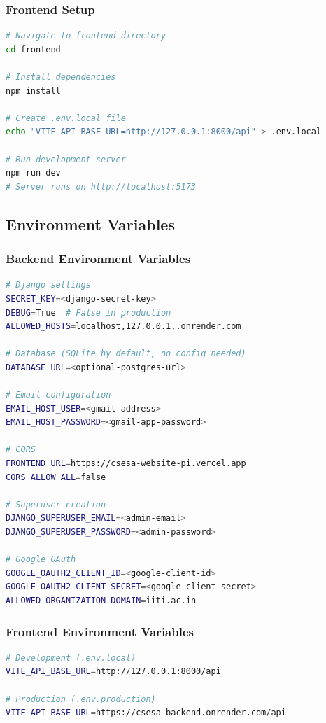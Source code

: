\documentclass[11pt,a4paper]{article}
\begin{document}
\subsubsection{Frontend Setup}
\begin{lstlisting}[language=bash]
# Navigate to frontend directory
cd frontend

# Install dependencies
npm install

# Create .env.local file
echo "VITE_API_BASE_URL=http://127.0.0.1:8000/api" > .env.local

# Run development server
npm run dev
# Server runs on http://localhost:5173
\end{lstlisting}

\subsection{Environment Variables}

\subsubsection{Backend Environment Variables}
\begin{lstlisting}[language=bash]
# Django settings
SECRET_KEY=<django-secret-key>
DEBUG=True  # False in production
ALLOWED_HOSTS=localhost,127.0.0.1,.onrender.com

# Database (SQLite by default, no config needed)
DATABASE_URL=<optional-postgres-url>

# Email configuration
EMAIL_HOST_USER=<gmail-address>
EMAIL_HOST_PASSWORD=<gmail-app-password>

# CORS
FRONTEND_URL=https://csesa-website-pi.vercel.app
CORS_ALLOW_ALL=false

# Superuser creation
DJANGO_SUPERUSER_EMAIL=<admin-email>
DJANGO_SUPERUSER_PASSWORD=<admin-password>

# Google OAuth
GOOGLE_OAUTH2_CLIENT_ID=<google-client-id>
GOOGLE_OAUTH2_CLIENT_SECRET=<google-client-secret>
ALLOWED_ORGANIZATION_DOMAIN=iiti.ac.in
\end{lstlisting}

\subsubsection{Frontend Environment Variables}
\begin{lstlisting}[language=bash]
# Development (.env.local)
VITE_API_BASE_URL=http://127.0.0.1:8000/api

# Production (.env.production)
VITE_API_BASE_URL=https://csesa-backend.onrender.com/api
\end{lstlisting}
\end{document}
